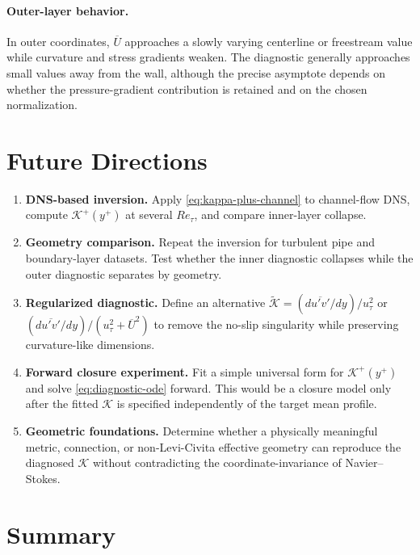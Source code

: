 \documentclass[11pt]{article}
\newcommand{\Ut}{\overline{U}}
\newcommand{\uv}{\overline{u'v'}}
\newcommand{\Ret}{Re_\tau}
\newcommand{\kapg}{\mathcal{K}}
\begin{document}
\paragraph{Outer-layer behavior.} In outer coordinates, $\Ut$ approaches a slowly varying centerline or freestream value while curvature and stress gradients weaken. The diagnostic generally approaches small values away from the wall, although the precise asymptote depends on whether the pressure-gradient contribution is retained and on the chosen normalization.

\section{Future Directions}
\label{sec:future}

\begin{enumerate}
\item \textbf{DNS-based inversion.} Apply \eqref{eq:kappa-plus-channel} to channel-flow DNS, compute $\kapg^+(y^+)$ at several $\Ret$, and compare inner-layer collapse.
\item \textbf{Geometry comparison.} Repeat the inversion for turbulent pipe and boundary-layer datasets. Test whether the inner diagnostic collapses while the outer diagnostic separates by geometry.
\item \textbf{Regularized diagnostic.} Define an alternative $\widetilde{\kapg}=(d\uv/dy)/u_\tau^2$ or $(d\uv/dy)/(u_\tau^2+\Ut^2)$ to remove the no-slip singularity while preserving curvature-like dimensions.
\item \textbf{Forward closure experiment.} Fit a simple universal form for $\kapg^+(y^+)$ and solve \eqref{eq:diagnostic-ode} forward. This would be a closure model only after the fitted $\kapg$ is specified independently of the target mean profile.
\item \textbf{Geometric foundations.} Determine whether a physically meaningful metric, connection, or non-Levi-Civita effective geometry can reproduce the diagnosed $\kapg$ without contradicting the coordinate-invariance of Navier--Stokes.
\end{enumerate}

\section{Summary}
\end{document}
